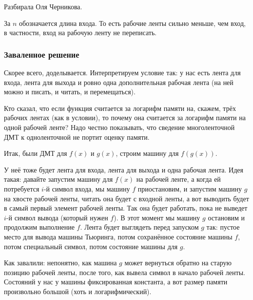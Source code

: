 	Разбирала Оля Черникова.

	За $n$ обозначается длина входа.
	То есть рабочие ленты сильно меньше, чем вход, в частности,
	вход на рабочую ленту не переписать.

	\subsubsection{Заваленное решение}
	Скорее всего, доделывается.
	Интерпретируем условие так: у нас есть лента для входа, лента для выхода и ровно одна дополнительная
	рабочая лента (на ней можно и писать, и читать, и перемещаться).
	\begin{Rem}
		Кто сказал, что если функция считается за логарифм памяти на, скажем, трёх рабочих лентах (как в условии),
		то почему она считается за логарифм памяти на одной рабочей ленте?
		Надо честно показывать, что сведение многоленточной ДМТ к одноленточной не портит оценку памяти.
	\end{Rem}
	Итак, были ДМТ для $f(x)$ и $g(x)$, строим машину для $f(g(x))$.
	
	У неё тоже будет лента для входа, лента для выхода и одна рабочая лента.
	Идея такая: давайте запустим машину для $f(x)$ на рабочей ленте, а когда ей потребуется
	$i$-й символ входа, мы машину $f$ приостановим, и запустим машину $g$ на хвосте рабочей
	ленты, читать она будет с входной ленты, а вот выводить будет в самый первый элемент рабочей ленты.
	Так она будет работать, пока не выведет $i$-й символ вывода (который нужен $f$).
	В этот момент мы машину $g$ остановим и продолжим выполнение $f$.
	Лента будет выглядеть перед запуском $g$ так: пустое место для вывода машины Тьюринга,
	потом сохранённое состояние машины $f$, потом специальный символ, потом состояние машины для $g$.

	Как завалили: непонятно, как машина $g$ может вернуться обратно на старую позицию рабочей ленты,
	после того, как вывела символ в начало рабочей ленты.
	Состояний у нас у машины фиксированная константа, а вот размер памяти произвольно большой (хоть и логарифмический).

